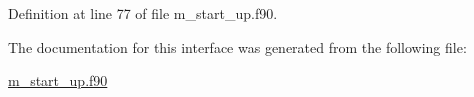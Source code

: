 Definition at line 77 of file m\+\_\+start\+\_\+up.\+f90.



The documentation for this interface was generated from the following file\+:\begin{DoxyCompactItemize}
\item 
\hyperlink{m__start__up_8f90}{m\+\_\+start\+\_\+up.\+f90}\end{DoxyCompactItemize}
